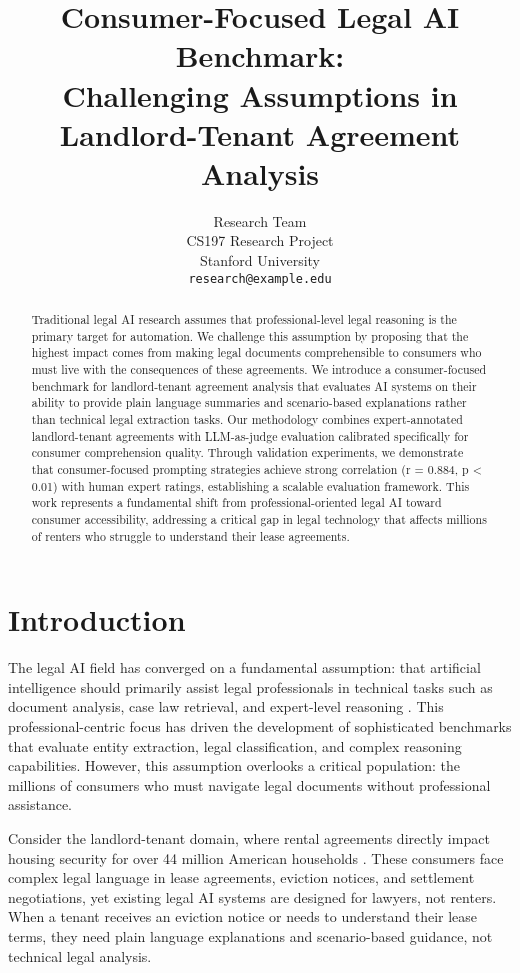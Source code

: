 \documentclass{article}
\title{Consumer-Focused Legal AI Benchmark: \\ Challenging Assumptions in Landlord-Tenant Agreement Analysis}
\author{
  Research Team \\
  CS197 Research Project \\
  Stanford University \\
  \texttt{research@example.edu}
}
\date{}
\begin{document}
\maketitle

\begin{abstract}
Traditional legal AI research assumes that professional-level legal reasoning is the primary target for automation. We challenge this assumption by proposing that the highest impact comes from making legal documents comprehensible to consumers who must live with the consequences of these agreements. We introduce a consumer-focused benchmark for landlord-tenant agreement analysis that evaluates AI systems on their ability to provide plain language summaries and scenario-based explanations rather than technical legal extraction tasks. Our methodology combines expert-annotated landlord-tenant agreements with LLM-as-judge evaluation calibrated specifically for consumer comprehension quality. Through validation experiments, we demonstrate that consumer-focused prompting strategies achieve strong correlation (r = 0.884, p < 0.01) with human expert ratings, establishing a scalable evaluation framework. This work represents a fundamental shift from professional-oriented legal AI toward consumer accessibility, addressing a critical gap in legal technology that affects millions of renters who struggle to understand their lease agreements.
\end{abstract}

\section{Introduction}

The legal AI field has converged on a fundamental assumption: that artificial intelligence should primarily assist legal professionals in technical tasks such as document analysis, case law retrieval, and expert-level reasoning \cite{guha2023legalbench, hendrycks2021cuad}. This professional-centric focus has driven the development of sophisticated benchmarks that evaluate entity extraction, legal classification, and complex reasoning capabilities. However, this assumption overlooks a critical population: the millions of consumers who must navigate legal documents without professional assistance.

Consider the landlord-tenant domain, where rental agreements directly impact housing security for over 44 million American households \cite{jchs2023america}. These consumers face complex legal language in lease agreements, eviction notices, and settlement negotiations, yet existing legal AI systems are designed for lawyers, not renters. When a tenant receives an eviction notice or needs to understand their lease terms, they need plain language explanations and scenario-based guidance, not technical legal analysis.
\end{document}
